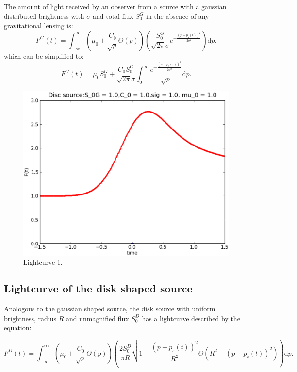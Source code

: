 The amount of light received by an observer from a source with a gaussian distributed brightness with $\sigma$ and total flux $S_0^G$ in the absence of any gravitational lensing is:
\begin{equation}
 F^G(t) = \int_{-\infty}^\infty  \left( \mu_0 + \frac{C_0}{\sqrt{p}} \Theta \left( p \right) \right) \left( \frac{S_0^G}{\sqrt{2 \pi} \sigma} e^{-\frac{(p-p_s(t))^2}{2 \sigma^2}} \right) \mathrm{d}p.
\end{equation}
which can be simplified to:
\begin{equation}
 F^G(t) = \mu_0 S_0^G + \frac{C_0 S_0^G}{\sqrt{2\pi} \sigma} \int_{0}^\infty \frac{e^{-\frac{(p-p_s(t))^2}{2 \sigma^2}}}{\sqrt{p}} \mathrm{d}p.
\end{equation}


\begin{figure}
\includegraphics[width = .8\textwidth]{plots/lightcurve_gaussian_1.eps}
\caption{\label{fig:lightcurve_gauss} Lightcurve 1.}
\end{figure}


\subsection{Lightcurve of the disk shaped source}

Analogous to the gaussian shaped source, the disk source with uniform brightness, radius $R$ and unmagnified flux $S_0^D$ has a lightcurve described by the equation:

\begin{equation}
 F^D(t) = \int_{-\infty}^\infty  \left( \mu_0 + \frac{C_0}{\sqrt{p}} \Theta \left( p \right) \right) \left( \frac{2 S_0^D}{ \pi R} \sqrt{1 - \frac{\left( p-p_s(t) \right)^2}{R^2}} \Theta \left(R^2 - \left(p-p_s(t) \right)^2 \right) \right) \mathrm{d}p.
\end{equation}

